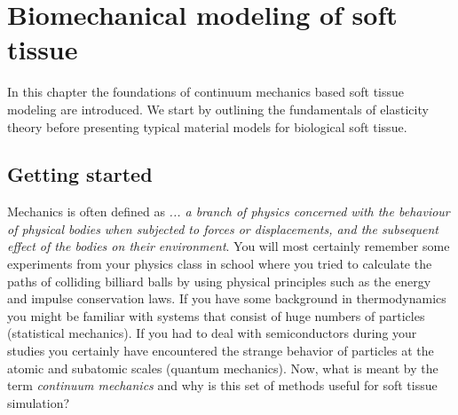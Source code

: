 
\chapter{Biomechanical modeling of soft tissue}

In this chapter the foundations of continuum mechanics based soft tissue modeling are introduced. We start by outlining the fundamentals of elasticity theory before presenting typical material models for biological soft tissue. 

\section{Getting started}

Mechanics is often defined as \emph{... a branch of physics concerned with the behaviour of physical bodies when subjected to forces or displacements, and the subsequent effect of the bodies on their environment}. You will most certainly remember some experiments from your physics class in school where you tried to calculate the paths of colliding billiard balls by using physical principles such as the energy and impulse conservation laws. If you have some background in thermodynamics you might be familiar with systems that consist of huge numbers of particles (statistical mechanics). If you had to deal with semiconductors during your studies you certainly have encountered the strange behavior of particles at the atomic and subatomic scales (quantum mechanics). Now, what is meant by the term \emph{continuum mechanics} and why is this set of methods useful for soft tissue simulation?

